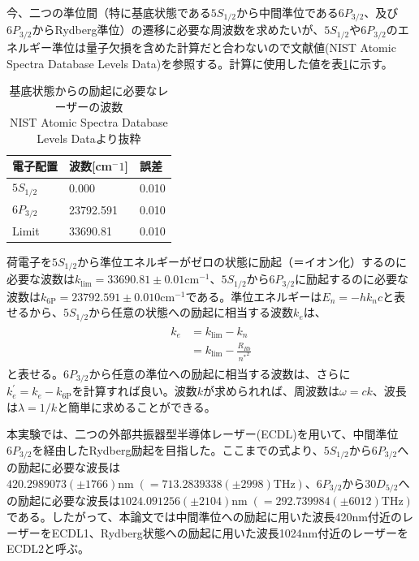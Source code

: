 \documentclass[dvipdfmx]{jsreport}
\begin{document}
今、二つの準位間（特に基底状態である$5S_{1/2}$から中間準位である$6P_{3/2}$、及び$6P_{3/2}$からRydberg準位）の遷移に必要な周波数を求めたいが、$5S_{1/2}$や$6P_{3/2}$のエネルギー準位は量子欠損を含めた計算だと合わないので文献値\cite{nist}(NIST Atomic Spectra Database Levels Data)を参照する。計算に使用した値を表\ref{table:nist}に示す。
\begin{table}[hbtp]
  \caption{基底状態からの励起に必要なレーザーの波数 \\
  NIST Atomic Spectra Database Levels Data\cite{nist}より抜粋}
  \label{table:nist}
  \centering
  \begin{tabular}{lll}
    \hline
    電子配置  & 波数[cm$^-1$] & 誤差 \\
    \hline
    \hline
    $5S_{1/2}$ & 0.000 & 0.010 \\
    $6P_{3/2}$ & 23792.591 & 0.010 \\
    Limit & 33690.81 & 0.010 \\
    \hline
  \end{tabular}
\end{table}

荷電子を$5S_{1/2}$から準位エネルギーがゼロの状態に励起（＝イオン化）するのに必要な波数は$k_{\text{lim}} = 33690.81 \pm 0.01\text{cm}^{-1}$、$5S_{1/2}$から$6P_{3/2}$に励起するのに必要な波数は$k_{\text{6P}} = 23792.591 \pm 0.010\text{cm}^{-1}$である。準位エネルギーは$E_n = -hk_nc$と表せるから、$5S_{1/2}$から任意の状態への励起に相当する波数$k_e$は、
\begin{align}
\begin{split}
\label{rydberg-frequency}
k_e &= k_{\text{lim}} - k_n \\
&= k_{\text{lim}} - \frac{R_{Rb}}{{n^*}^2}
\end{split}
\end{align}
と表せる。$6P_{3/2}$から任意の準位への励起に相当する波数は、さらに$k_e^{'} = k_e - k_{\text{6P}}$を計算すれば良い。波数$k$が求められれば、周波数は$\omega = ck$、波長は$\lambda = 1 / k$と簡単に求めることができる。

本実験では、二つの外部共振器型半導体レーザー(ECDL)を用いて、中間準位$6P_{3/2}$を経由したRydberg励起を目指した。ここまでの式より、$5S_{1/2}$から$6P_{3/2}$への励起に必要な波長は$420.2989073(\pm 1766)\text{nm}\; \left(= 713.2839338(\pm 2998)\text{THz} \right)$、$6P_{3/2}$から$30D_{5/2}$への励起に必要な波長は$1024.091256(\pm 2104)\text{nm}\; \left(= 292.739984(\pm 6012)\text{THz} \right)$である。したがって、本論文では中間準位への励起に用いた波長420nm付近のレーザーをECDL1、Rydberg状態への励起に用いた波長1024nm付近のレーザーをECDL2と呼ぶ。
\end{document}

